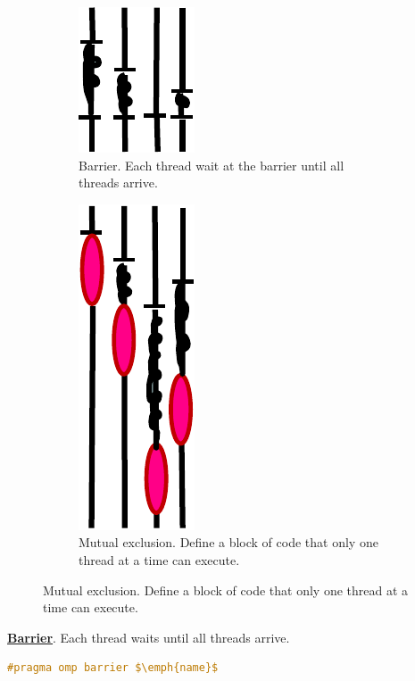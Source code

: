 \begin{figure}[!htp]
    \centering
    \begin{subfigure}{.45\textwidth}
        \centering
        \includegraphics[width=.25\textwidth]{img/openmp-sync-1.pdf}
        \caption{Barrier. Each thread wait at the barrier until all threads arrive.}
    \end{subfigure}
    \hfill
    \begin{subfigure}{.45\textwidth}
        \centering
        \includegraphics[width=.25\textwidth]{img/openmp-sync-2.pdf}
        \caption{Mutual exclusion. Define a block of code that only one thread at a time can execute.}
    \end{subfigure}
\end{figure}

\newpage

\noindent
\textbf{\underline{Barrier}}. Each thread waits until all threads arrive.
\begin{openmpbox}
    \begin{lstlisting}[language=C++, mathescape=true]
#pragma omp barrier $\emph{name}$\end{lstlisting}
\end{openmpbox}

